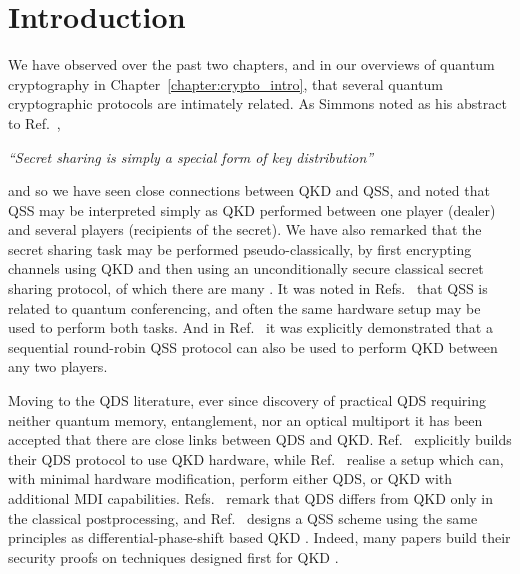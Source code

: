 \section{Introduction}

We have observed over the past two chapters, and in our overviews of quantum cryptography in Chapter~\ref{chapter:crypto_intro}, that several quantum cryptographic protocols are intimately related. As Simmons noted as his abstract to Ref.~\cite{Simmons1990a},

\begin{center}\emph{``Secret sharing is simply a special form of key distribution''}\end{center}



\noindent and so we have seen close connections between QKD and QSS, and noted that QSS may be interpreted simply as QKD performed between one player (dealer) and several players (recipients of the secret). We have also remarked that the secret sharing task may be performed pseudo-classically, by first encrypting channels using QKD and then using an unconditionally secure classical secret sharing protocol, of which there are many \cite{Schneier1996}. It was noted in Refs.~\cite{Hillery1999, Chen2005a, Wu2016, Ottaviani2017b} that QSS is related to quantum conferencing, and often the same hardware setup may be used to perform both tasks. And in Ref.~\cite{Grice2019} it was explicitly demonstrated that a sequential round-robin QSS protocol can also be used to perform QKD between any two players. 

Moving to the QDS literature, ever since discovery of practical QDS requiring neither quantum memory, entanglement, nor an optical multiport it has been accepted that there are close links between QDS and QKD. Ref.~\cite{Wallden2015} explicitly builds their QDS protocol to use QKD hardware, while Ref.~\cite{Roberts2017} realise a setup which can, with minimal hardware modification, perform either QDS, or QKD with additional MDI capabilities. Refs.~\cite{Collins2016, Yin2017, Yin2017c, An2019, Roberts2017} remark that QDS differs from QKD only in the classical postprocessing, and Ref.~\cite{Wei2018} designs a QSS scheme using the same principles as differential-phase-shift based QKD \cite{Sasaki2014}. Indeed, many papers build their security proofs on techniques designed first for QKD \cite{Kogias2017, Grice2019, Wei2018, Grice2015, Armstrong2015}.


